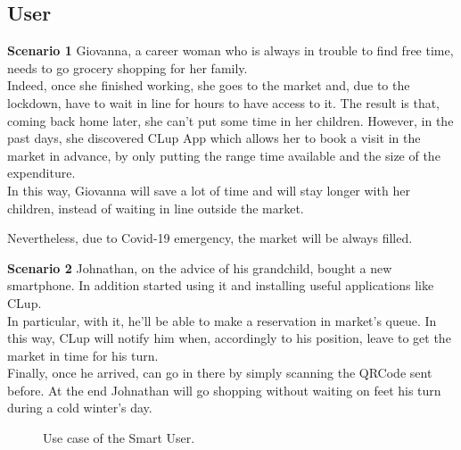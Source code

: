 \subsection{User}
\bigbreak
\bigbreak

{\normalsize \textbf{Scenario 1}}
Giovanna, a career woman who is always in trouble to find free time, needs to go grocery shopping for her family.\\ 
Indeed, once she finished working, she goes to the market and, due to the lockdown, have to wait in line for hours to have access to it. The result is that, coming back home later, she can't put some time in her children.
However, in the past days, she discovered CLup App which allows her to book a visit in the market in advance, by only putting the range time available and the size of the expenditure.\\
In this way, Giovanna will save a lot of time and will stay longer with her children, instead of waiting in line outside the market.

Nevertheless, due to Covid-19 emergency, the market will be always filled.

\par \medskip


{\normalsize \textbf{Scenario 2}} Johnathan, on the advice of his grandchild, bought a new smartphone.  In addition started using it and installing useful applications like CLup.\\
In particular, with it, he'll be able to make a reservation in market's queue. In this way, CLup will notify him when, accordingly to his position, leave to get the market in time for his turn.\\
Finally, once he arrived, can go in there by simply scanning the QRCode sent before. 
At the end Johnathan will go shopping without waiting on feet his turn during a cold winter's day.

\begin{figure}[H]
  \centering
    \caption{Use case of the Smart User.}
\end{figure}

